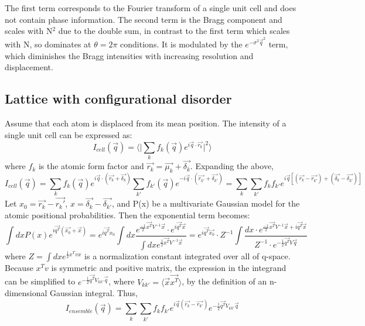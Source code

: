 \documentclass{article}
\begin{document}
The first term corresponds to the Fourier transform of a single unit cell and does not contain phase information. The second term is the Bragg component and scales with N$^2$ due to the double sum, in contrast to the first term which scales with N, so dominates at $\theta = 2\pi$ conditions. It is modulated by the $e^{-\sigma^2\vec{q}^2}$ term, which diminishes the Bragg intensities with increasing resolution and displacement.

\subsection{Lattice with configurational disorder}
Assume that each atom is displaced from its mean position. The intensity of a single unit cell can be expressed as:
\begin{equation}
I_{cell}(\vec{q}) = \langle \vert \sum\limits_{k} f_k(\vec{q})e^{i\vec{q}\cdot\vec{r_k}}\vert^2 \rangle
\end{equation}
where $f_k$ is the atomic form factor and $\vec{r_k} = \vec{\mu_k} + \vec{\delta_k}$.
Expanding the above,
\begin{equation}
I_{cell}(\vec{q}) = \sum\limits_{k} f_k(\vec{q})e^{i\vec{q}\cdot(\vec{r_k} + \vec{\delta_k})} \sum\limits_{k'} f_{k'}(\vec{q})e^{-i\vec{q}\cdot(\vec{r_{k'}} + \vec{\delta_{k'}})}
= \sum\limits_{k}\sum\limits_{k'}f_{k}f_{k'}e^{i\vec{q}[(\vec{r_{k}} - \vec{r_{k'}}) + (\vec{\delta_{k}} - \vec{\delta_{k'}})]}
\end{equation}
Let $x_0 = \vec{r_k} - \vec{r_k'}$, $x = \vec{\delta_{k}} - \vec{\delta_{k'}}$, and P(x) be a multivariate Gaussian model for the atomic positional probabilities. Then the exponential term becomes:
\begin{equation}
\int dx P(x) e^{i\vec{q^T}(\vec{x_0} + \vec{x})} = e^{i\vec{q^T} x_0} \int dx \frac{e^{\frac{-1}{2}\vec{x^T}V^{-1}\vec{x}} \cdot e^{i\vec{q^T}\vec{x}}} {\int dx e^{\frac{1}{2} \vec{x^T}V^{-1}\vec{x}}} = e^{i\vec{q^T}\vec{x_0}} \cdot Z^{-1} \int \frac{dx \cdot e^{ \frac{-1}{2}\vec{x^T}V^{-1}\vec{x} + i\vec{q^T}\vec{x}}}{Z^{-1} \cdot e^{- \frac{1}{2} \vec{q^T}V\vec{q}}}
\end{equation}
where $Z = \int dx e^{\frac{1}{2} x^Tvx}$ is a normalization constant integrated over all of q-space. Because $x^Tv$ is symmetric and positive matrix, the expression in the integrand can be simplified to $e^{- \frac{1}{2} \vec{q^T}V_{kk'}\vec{q}}$, where $V_{kk'}=\langle \vec{x}\vec{x^T} \rangle$, by the definition of an n-dimensional Gaussian integral. Thus,
\begin{equation}
I_{ensemble} (\vec{q}) = \sum\limits_{k}\sum\limits_{k'}f_{k}f_{k'}e^{i\vec{q}(\vec{r_{k}} - \vec{r_{k'}})}e^{-\frac{1}{2}\vec{q^T}V_{kk'}\vec{q}}
\end{equation}
\end{document}
